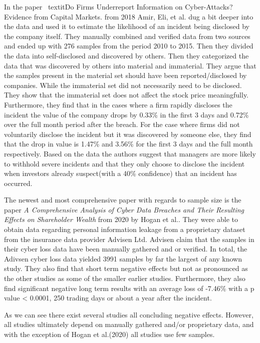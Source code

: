 In the paper \, textit{Do Firms Underreport Information on Cyber-Attacks? Evidence from Capital Markets.}\cite{amir2018firms} from 2018 Amir, Eli, et al. dug a bit deeper into the data and used it to estimate the likelihood of an incident being disclosed by the company itself. They manually combined and verified data from two sources and ended up with 276 samples from the period 2010 to 2015. Then they divided the data into self-disclosed and discovered by others. Then they categorized the data that was discovered by others into material and immaterial. They argue that the samples present in the material set should have been reported/disclosed by companies. While the immaterial set did not necessarily need to be disclosed. They show that the immaterial set does not affect the stock price meaningfully. Furthermore, they find that in the cases where a firm rapidly discloses the incident the value of the company drops by 0.33\% in the first 3 days and 0.72\% over the full month period after the breach. For the case where firms did not voluntarily disclose the incident but it was discovered by someone else, they find that the drop in value is 1.47\% and 3.56\% for the first 3 days and the full month respectively. Based on the data the authors suggest that managers are more likely to withhold severe incidents and that they only choose to disclose the incident when investors already suspect(with a 40\% confidence) that an incident has occurred. 

The newest and most comprehensive paper with regards to sample size is the paper \textit{A Comprehensive Analysis of Cyber Data Breaches and Their Resulting Effects on Shareholder Wealth} from 2020 by Hogan et al.\cite{hogan2020comprehensive}. They were able to obtain data regarding personal information leakage from a proprietary dataset from the insurance data provider Advisen Ltd. Advisen claim that the samples in their cyber loss data have been manually gathered and or verified. In total, the Adivsen cyber loss data yielded 3991 samples by far the largest of any known study. They also find that short term negative effects but not as pronounced as the other studies as some of the smaller earlier studies. Furthermore, they also find significant negative long term results with an average loss of -7.46\% with a p value < 0.0001, 250 trading days or about a year after the incident.

As we can see there exist several studies all concluding negative effects. However, all studies ultimately depend on manually gathered and/or proprietary data, and with the exception of Hogan et al.(2020) all studies use few samples.
